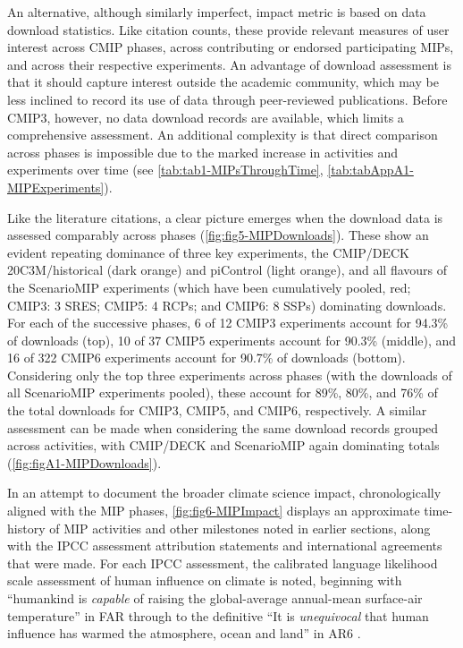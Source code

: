 \documentclass[manuscript]{copernicus}
\begin{document}
An alternative, although similarly imperfect, impact metric is based on data download statistics. Like citation counts, these provide relevant measures of user interest across CMIP phases, across contributing or endorsed participating MIPs, and across their respective experiments. An advantage of download assessment is that it should capture interest outside the academic community, which may be less inclined to record its use of data through peer-reviewed publications. Before CMIP3, however, no data download records are available, which limits a comprehensive assessment. An additional complexity is that direct comparison across phases is impossible due to the marked increase in activities and experiments over time (see \autoref{tab:tab1-MIPsThroughTime}, \autoref{tab:tabAppA1-MIPExperiments}).

Like the literature citations, a clear picture emerges when the download data is assessed comparably across phases (\autoref{fig:fig5-MIPDownloads}). These show an evident repeating dominance of three key experiments, the CMIP/DECK 20C3M/historical (dark orange) and piControl (light orange), and all flavours of the ScenarioMIP experiments (which have been cumulatively pooled, red; CMIP3: 3 SRES; CMIP5: 4 RCPs; and CMIP6: 8 SSPs) dominating downloads. For each of the successive phases, 6 of 12 CMIP3 experiments account for 94.3\% of downloads (top), 10 of 37 CMIP5 experiments account for 90.3\% (middle), and 16 of 322 CMIP6 experiments account for 90.7\% of downloads (bottom). Considering only the top three experiments across phases (with the downloads of all ScenarioMIP experiments pooled), these account for 89\%, 80\%, and 76\% of the total downloads for CMIP3, CMIP5, and CMIP6, respectively. A similar assessment can be made when considering the same download records grouped across activities, with CMIP/DECK and ScenarioMIP again dominating totals (\autoref{fig:figA1-MIPDownloads}).

In an attempt to document the broader climate science impact, chronologically aligned with the MIP phases, \autoref{fig:fig6-MIPImpact} displays an approximate time-history of MIP activities and other milestones noted in earlier sections, along with the IPCC assessment attribution statements and international agreements that were made. For each IPCC assessment, the calibrated language likelihood scale \citep[e.g.,][]{mastrandrea_guidance_2010} assessment of human influence on climate is noted, beginning with ``humankind is \textit{capable} of raising the global-average annual-mean surface-air temperature'' in FAR \citep{ipcc_policymakers_1990} through to the definitive ``It is \textit{unequivocal} that human influence has warmed the atmosphere, ocean and land'' in AR6 \citep{ipcc_summary_2021}.
\end{document}
